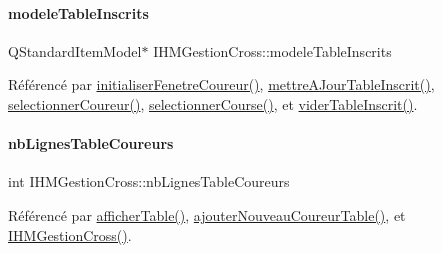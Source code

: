 \paragraph{\texorpdfstring{modele\+Table\+Inscrits}{modeleTableInscrits}}
{\footnotesize\ttfamily Q\+Standard\+Item\+Model$\ast$ I\+H\+M\+Gestion\+Cross\+::modele\+Table\+Inscrits\hspace{0.3cm}{\ttfamily [private]}}



Référencé par \hyperlink{class_i_h_m_gestion_cross_aa5d9de499a66e52b843c4ef4c6074a60}{initialiser\+Fenetre\+Coureur()}, \hyperlink{class_i_h_m_gestion_cross_a3c96fb9d92e9392ea83b380c3648bf55}{mettre\+A\+Jour\+Table\+Inscrit()}, \hyperlink{class_i_h_m_gestion_cross_ad71963d500fd61995fdae94e833db163}{selectionner\+Coureur()}, \hyperlink{class_i_h_m_gestion_cross_ae555b32462455a2cdaf0f8dc2e016d14}{selectionner\+Course()}, et \hyperlink{class_i_h_m_gestion_cross_ac1ca02b1cb49d9c2f60785c8bd441d60}{vider\+Table\+Inscrit()}.

\mbox{\label{class_i_h_m_gestion_cross_a0f4f5886077b1c5cbfa9cc0680d0380f}} 
\paragraph{\texorpdfstring{nb\+Lignes\+Table\+Coureurs}{nbLignesTableCoureurs}}
{\footnotesize\ttfamily int I\+H\+M\+Gestion\+Cross\+::nb\+Lignes\+Table\+Coureurs\hspace{0.3cm}{\ttfamily [private]}}



Référencé par \hyperlink{class_i_h_m_gestion_cross_ae1510779a1efa3defecb517467e84f91}{afficher\+Table()}, \hyperlink{class_i_h_m_gestion_cross_aa3e6f06ff2f4e724e2f0688528bcf386}{ajouter\+Nouveau\+Coureur\+Table()}, et \hyperlink{class_i_h_m_gestion_cross_a2c62fd83326a87456a403f46acc408c8}{I\+H\+M\+Gestion\+Cross()}.

\mbox{\label{class_i_h_m_gestion_cross_ad33a263cb137ae991a9be57dacc6760a}} 
